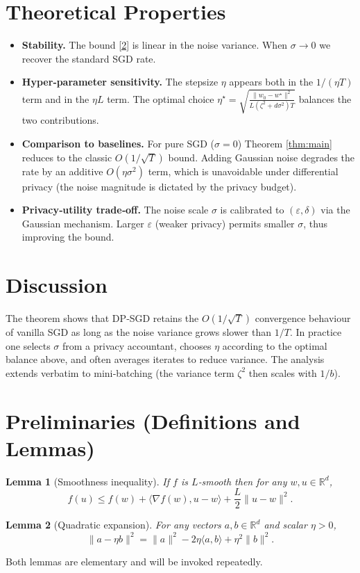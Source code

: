 \documentclass{article}
\newtheorem{lemma}{Lemma}
\newcommand{\R}{\mathbb{R}}
\begin{document}
\section*{Theoretical Properties}
\begin{itemize}
\item \textbf{Stability.} The bound \eqref{2} is linear in the noise variance.
When $\sigma\to0$ we recover the standard SGD rate.
\item \textbf{Hyper‑parameter sensitivity.}
The stepsize $\eta$ appears both in the $1/(\eta T)$ term and in the
$\eta L$ term. The optimal choice $\eta^\star = \sqrt{\frac{\|w_0-w^\star\|^2}
{L(\zeta^2+d\sigma^2)T}}$ balances the two contributions.
\item \textbf{Comparison to baselines.}
For pure SGD ($\sigma=0$) Theorem \ref{thm:main} reduces to the classic
$O(1/\sqrt{T})$ bound. Adding Gaussian noise degrades the rate by an
additive $O(\eta\sigma^2)$ term, which is unavoidable under differential
privacy (the noise magnitude is dictated by the privacy budget).
\item \textbf{Privacy‑utility trade‑off.}
The noise scale $\sigma$ is calibrated to $(\varepsilon,\delta)$ via the
Gaussian mechanism. Larger $\varepsilon$ (weaker privacy) permits smaller
$\sigma$, thus improving the bound.
\end{itemize}

\section*{Discussion}
The theorem shows that DP‑SGD retains the $O(1/\sqrt{T})$ convergence
behaviour of vanilla SGD as long as the noise variance grows slower than
$1/T$. In practice one selects $\sigma$ from a privacy accountant,
chooses $\eta$ according to the optimal balance above, and often
averages iterates to reduce variance. The analysis extends verbatim to
mini‑batching (the variance term $\zeta^2$ then scales with $1/b$).

\section*{Preliminaries (Definitions and Lemmas)}
\begin{lemma}[Smoothness inequality]\label{lem:smooth}
If $f$ is $L$‑smooth then for any $w,u\in\R^d$,
\[
f(u)\le f(w)+\langle\nabla f(w),u-w\rangle+\frac{L}{2}\|u-w\|^2 .
\]
\end{lemma}
\begin{lemma}[Quadratic expansion]\label{lem:exp}
For any vectors $a,b\in\R^d$ and scalar $\eta>0$,
\[
\|a-\eta b\|^2 = \|a\|^2 -2\eta\langle a,b\rangle +\eta^2\|b\|^2 .
\]
\end{lemma}
Both lemmas are elementary and will be invoked repeatedly.
\end{document}
